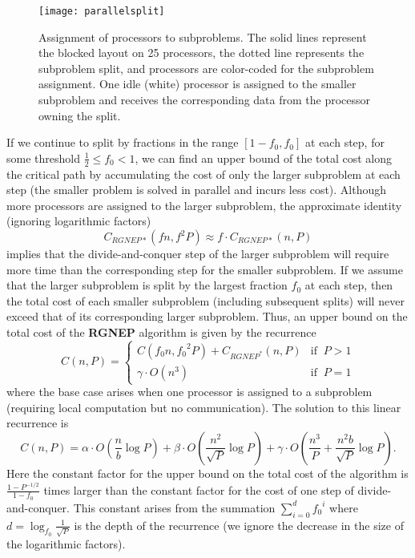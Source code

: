 \documentclass{article}
\def\lt{\left}
\def\rt{\right}
\theoremstyle{definition}
\begin{document}
\begin{figure}
\centering
\texttt{[image: parallelsplit]}
\caption{Assignment of processors to subproblems.  The solid lines represent the blocked layout on 25 processors, the dotted line represents the subproblem split, and processors are color-coded for the subproblem assignment.  One idle (white) processor is assigned to the smaller subproblem and receives the corresponding data from the processor owning the split.}
\label{fig:parallelsplit}
\end{figure}

If we continue to split by fractions in the range $[1-f_0,f_0]$ at each step, for some threshold $\frac12 \leq f_0<1$, we can find an upper bound of the total cost along the critical path by accumulating the cost of only the larger subproblem at each step (the smaller problem is solved in parallel and incurs less cost).  Although more processors are assigned to the larger subproblem, the approximate identity (ignoring logarithmic factors)
$$C_{RGNEP*}(fn,f^2P) \approx f \cdot C_{RGNEP*}(n,P)$$
implies that the divide-and-conquer step of the larger subproblem will require more time than the corresponding step for the smaller subproblem.  If we assume that the larger subproblem is split by the largest fraction $f_0$ at each step, then the total cost of each smaller subproblem (including subsequent splits) will never exceed that of its corresponding larger subproblem.  Thus, an upper bound on the total cost of  the {\bf RGNEP} algorithm is given by the recurrence
$$C(n,P) = \left\{ \begin{array}{lr}
C\lt(f_0n,{f_0}^2P\rt) + C_{RGNEP^*}(n,P) & \text{if}\;\; P>1  \\
 \gamma \cdot O \lt(n^3\rt) & \text{if}\;\; P=1
\end{array} \right.$$
where the base case arises when one processor is assigned to a subproblem (requiring local computation but no communication).  The solution to this linear recurrence is
$$C(n,P) = \alpha \cdot O\lt( \frac nb \log P \rt) + \beta \cdot O\lt( \frac{n^2}{\sqrt P} \log P\rt) + \gamma \cdot O\lt( \frac{n^3}{P}+\frac{n^2b}{\sqrt P}\log P  \rt).$$
Here the constant factor for the upper bound on the total cost of the algorithm is $\frac{1-P^{-1/2}}{1-f_0}$ times larger than the constant factor for the cost of one step of divide-and-conquer.  This constant arises from the summation $\sum_{i=0}^d {f_0}^i$ where $d=\log_{f_0} \frac{1}{\sqrt P}$ is the depth of the recurrence (we ignore the decrease in the size of the logarithmic factors).
\end{document}

